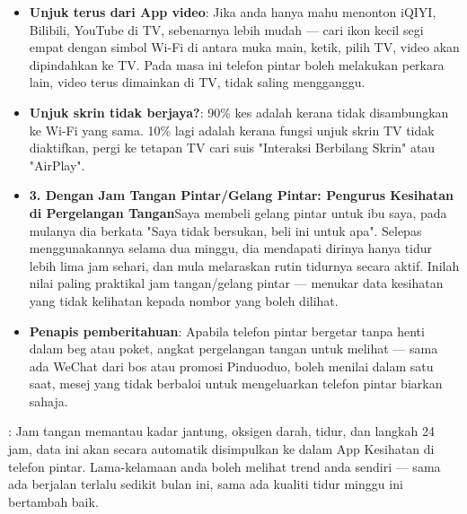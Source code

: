 \begin{itemize}
  \item \textbf{Unjuk terus dari App video}: Jika anda hanya mahu menonton iQIYI, Bilibili, YouTube di TV, sebenarnya lebih mudah — cari ikon kecil segi empat dengan simbol Wi-Fi di antara muka main, ketik, pilih TV, video akan dipindahkan ke TV. Pada masa ini telefon pintar boleh melakukan perkara lain, video terus dimainkan di TV, tidak saling mengganggu.
  \item \textbf{Unjuk skrin tidak berjaya?}: 90\% kes adalah kerana tidak disambungkan ke Wi-Fi yang sama. 10\% lagi adalah kerana fungsi unjuk skrin TV tidak diaktifkan, pergi ke tetapan TV cari suis "Interaksi Berbilang Skrin" atau "AirPlay".
  \item \textbf{3. Dengan Jam Tangan Pintar/Gelang Pintar: Pengurus Kesihatan di Pergelangan Tangan}Saya membeli gelang pintar untuk ibu saya, pada mulanya dia berkata "Saya tidak bersukan, beli ini untuk apa". Selepas menggunakannya selama dua minggu, dia mendapati dirinya hanya tidur lebih lima jam sehari, dan mula melaraskan rutin tidurnya secara aktif. Inilah nilai paling praktikal jam tangan/gelang pintar — menukar data kesihatan yang tidak kelihatan kepada nombor yang boleh dilihat.
  \item \textbf{Penapis pemberitahuan}: Apabila telefon pintar bergetar tanpa henti dalam beg atau poket, angkat pergelangan tangan untuk melihat — sama ada WeChat dari bos atau promosi Pinduoduo, boleh menilai dalam satu saat, mesej yang tidak berbaloi untuk mengeluarkan telefon pintar biarkan sahaja.
\end{itemize}


: Jam tangan memantau kadar jantung, oksigen darah, tidur, dan langkah 24 jam, data ini akan secara automatik disimpulkan ke dalam App Kesihatan di telefon pintar. Lama-kelamaan anda boleh melihat trend anda sendiri — sama ada berjalan terlalu sedikit bulan ini, sama ada kualiti tidur minggu ini bertambah baik.

